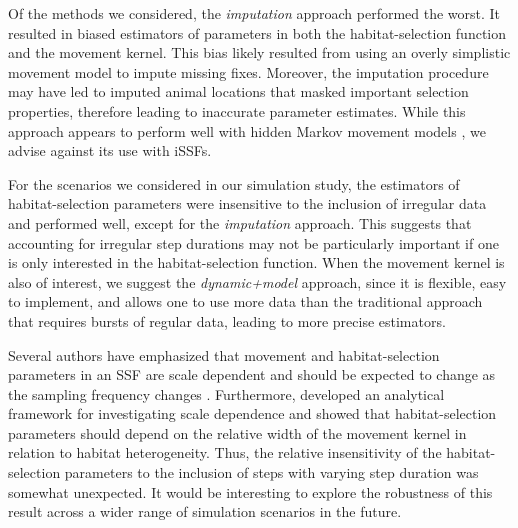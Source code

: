 \documentclass[../FinalThesis.tex]{subfiles}
\begin{document}
Of the methods we considered, the \textit{imputation} approach performed the
worst. It resulted in biased estimators of parameters in both the
habitat-selection function and the movement kernel. This bias likely resulted
from using an overly simplistic movement model to impute missing fixes.
Moreover, the imputation procedure may have led to imputed animal locations that
masked important selection properties, therefore leading to inaccurate parameter
estimates. While this approach appears to perform well with hidden Markov
movement models \citep{McClintock.2017}, we advise against its use with iSSFs.

For the scenarios we considered in our simulation study, the estimators of
habitat-selection parameters were insensitive to the inclusion of irregular data
and performed well, except for the \textit{imputation} approach. This suggests
that accounting for irregular step durations may not be particularly important
if one is only interested in the habitat-selection function. When the movement
kernel is also of interest, we suggest the \textit{dynamic+model} approach,
since it is flexible, easy to implement, and allows one to use more data than
the traditional approach that requires bursts of regular data, leading to more
precise estimators.

Several authors have emphasized that movement and habitat-selection parameters
in an SSF are scale dependent and should be expected to change as the sampling
frequency changes \citep[see for example][]{Avgar.2016, Signer.2017,
Fieberg.2021}. Furthermore, \citet{Barnett.2008} developed an analytical
framework for investigating scale dependence and showed that habitat-selection
parameters should depend on the relative width of the movement kernel in
relation to habitat heterogeneity. Thus, the relative insensitivity of the
habitat-selection parameters to the inclusion of steps with varying step
duration was somewhat unexpected. It would be interesting to explore the
robustness of this result across a wider range of simulation scenarios in the
future.
\end{document}
